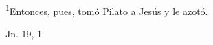 \documentclass[../../rosario.tex]{subfiles}
\begin{document}
    \textsuperscript{1}Entonces, pues, tomó Pilato a Jesús y le azotó.
    \begin{flushright}
    Jn. 19, 1
    \end{flushright}
\end{document}
